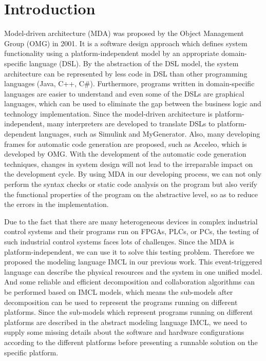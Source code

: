 \section{Introduction}
Model-driven architecture (MDA) was proposed by the Object Management Group (OMG) in 2001. It is a software design approach which defines system functionality using a platform-independent model by an appropriate domain-specific language (DSL). By the abstraction of the DSL model, the system architecture can be represented by less code in DSL than other programming languages (Java, C++, C\#). Furthermore, programs written in domain-specific languages are easier to understand and even some of the DSLs are graphical languages, which can be used to eliminate the gap between the business logic and technology implementation. Since the model-driven architecture is platform-independent, many interpreters are developed to translate DSLs to platform-dependent languages, such as Simulink and MyGenerator. Also, many developing frames for automatic code generation are proposed, such as Acceleo, which is developed by OMG. With the development of the automatic code generation techniques, changes in system design will not lead to the irreparable impact on the development cycle. By using MDA in our developing process, we can not only perform the syntax checks or static code analysis on the program but also verify the functional properties of the program on the abstractive level, so as to reduce the errors in the implementation.

Due to the fact that there are many heterogeneous devices in complex industrial control systems and their programs run on FPGAs, PLCs, or PCs, the testing of such industrial control systems faces lots of challenges. Since the MDA is platform-independent, we can use it to solve this testing problem. Therefore we proposed the modeling language IMCL in our previous work\cite{li2017decomposition}. This event-triggered language can describe the physical resources and the system in one unified model. And some reliable and efficient decomposition and collaboration algorithms can be performed based on IMCL models, which means the sub-models after decomposition can be used to represent the programs running on different platforms. Since the sub-models which represent programs running on different platforms are described in the abstract modeling language IMCL, we need to supply some missing details about the software and hardware configurations according to the different platforms before presenting a runnable solution on the specific platform.

